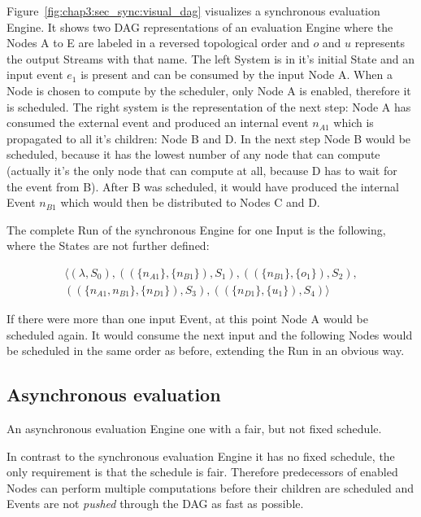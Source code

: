 Figure~\ref{fig:chap3:sec_sync:visual_dag} visualizes a synchronous evaluation Engine.
It shows two DAG representations of an evaluation Engine  where the Nodes A to E are labeled in a reversed topological order and \(o\) and \(u\) represents the output Streams with that name.
The left System is in it's initial State and an input event \(e_1\) is present and can be consumed by the input Node A.
When a Node is chosen to compute by the scheduler, only Node A is enabled, therefore it is scheduled.
The right system is the representation of the next step: Node A has consumed the external event and produced an internal event \(n_{A1}\) which is propagated to all it's children: Node B and D.
In the next step Node B would be scheduled, because it has the lowest number of any node that can compute (actually it's the only node that can compute at all, because D has to wait for the event from B).
After B was scheduled, it would have produced the internal Event \(n_{B1}\) which would then be distributed to Nodes C and D.

The complete Run of the synchronous Engine for one Input is the following, where the States are not further defined:

\begin{align*}
  \langle
    (\lambda,                             S_0),
    ((\{ n_{A1}         \}, \{n_{B1}\}),  S_1),
    ((\{ n_{B1}         \}, \{o_1\}),     S_2),\\
    ((\{ n_{A1}, n_{B1} \}, \{n_{D1}\}),  S_3),
    ((\{ n_{D1}         \}, \{u_1\}),     S_4)
  \rangle
\end{align*}

If there were more than one input Event, at this point Node A would be scheduled again.
It would consume the next input and the following Nodes would be scheduled in the same order as before, extending the Run in an obvious way.

\subsection{Asynchronous evaluation}
\label{sec:concepts:behaviour_without_timing:async}

An asynchronous evaluation Engine one with a fair, but not fixed schedule.

In contrast to the synchronous evaluation Engine it has no fixed schedule, the only requirement is that the schedule is fair.
Therefore predecessors of enabled Nodes can perform multiple computations before their children are scheduled and Events are not \emph{pushed} through the DAG as fast as possible.

